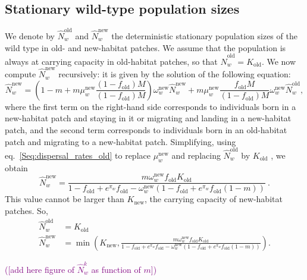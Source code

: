 \documentclass[11pt]{article}
\newcommand{\florence}[1]{\textcolor{purple}{(#1)}} %
\begin{document}
\subsection{Stationary wild-type population sizes}
We denote by $\widehat{N}_w^{\text{old}}$ and $\widehat{N}_w^{\text{new}}$ the deterministic stationary population sizes of the wild type in old- and new-habitat patches. We assume that the population is always at carrying capacity in old-habitat patches, so that $\widehat{N}_w^{\text{old}} = K_{\text{old}}$. We now compute $\widehat{N}_w^{\text{new}}$ recursively: it is given by the solution of the following equation: 
%
\begin{equation}\label{Seq:wt_deme2}
\widehat{N}_w^{\text{new}} = \left(1-m + m \mu_w^{\text{new}}  \frac{(1-f_{\text{old}})M}{(1-f_{\text{old}})M}\right)  \omega_w^{\text{new}}  \widehat{N}_w^{\text{new}}   + m \mu_w^{\text{new}} \frac{f_{\text{old}} M}{(1-f_{\text{old}})M} \omega_w^{\text{new}}  \widehat{N}_w^{\text{old}}, \nonumber 
\end{equation}
where the first term on the right-hand side corresponds to individuals born in a new-habitat patch and staying in it or migrating and landing in a new-habitat patch, and the second term corresponds to individuals born in an old-habitat patch and migrating to a new-habitat patch. Simplifying, using eq.~\eqref{Seq:dispersal_rates_old} to replace $\mu_w^{\text{new}} $ and replacing $\widehat{N}_w^{\text{old}}$ by $K_{\text{old}}$ , we obtain
%
\begin{equation}
\widehat{N}_w^{\text{new}} = \frac{m \omega_w^{\text{new}} f_{\text{old}}  K_{\text{old}}}{
1-f_{\text{old}} + e^{\pi_w} f_{\text{old}} - \omega_w^{\text{new}} (1-f_{\text{old}} + e^{\pi_w} f_{\text{old}} (1-m))
}
\ .
\end{equation}
%
This value cannot be larger than $K_{\text{new}}$, the carrying capacity of new-habitat patches. So, 
\begin{subequations}\label{Seq:Nhat}
	\begin{align}
	\widehat{N}_w^{\text{old}} &= K_{\text{old}} \\
	\widehat{N}_w^{\text{new}} &= \min\left(K_{\text{new}},  \frac{m \omega_w^{\text{new}} f_{\text{old}}  K_{\text{old}}}{
	1-f_{\text{old}} +  e^{\pi_w} f_{\text{old}} - \omega_w^{\text{new}} (1-f_{\text{old}} + e^{\pi_w} f_{\text{old}} (1-m))
} \right).\label{Seq:Nhatnew}
	\end{align}
\end{subequations}

\florence{[add here figure of $\widehat{N}_w^k$ as function of $m$]}
\end{document}
